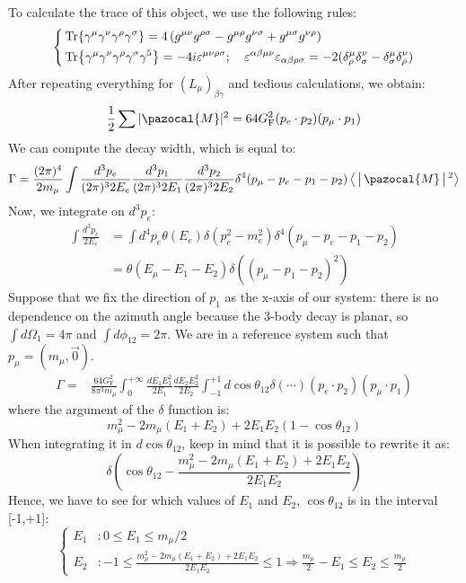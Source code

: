 \documentclass[../main.tex]{subfiles}
\begin{document}
To calculate the trace of this object, we use the following rules:
\[
\left\{
\begin{aligned}
&\Tr{\gamma^\mu\gamma^\nu\gamma^\rho\gamma^\sigma}=4\left(g^{\mu\nu}g^{\rho\sigma}-g^{\mu\rho}g^{\nu\sigma}+g^{\mu\sigma}g^{\nu\rho}\right)\\
&\Tr{\gamma^\mu\gamma^\nu\gamma^\rho\gamma^\sigma\gamma^5}=-4i\varepsilon^{\mu\nu\rho\sigma}; \quad \varepsilon^{\alpha\beta\mu\nu}\varepsilon_{\alpha\beta\rho\sigma}=-2(\delta^\mu_\rho\delta^\nu_\sigma-\delta^\mu_\sigma\delta^\nu_\rho)
\end{aligned}
\right.
\]
After repeating everything for $(L_\mu)_{\beta\gamma}$ and tedious calculations, we obtain:
\[
\frac{1}{2}\sum|\pazocal{M}|^2=64G^2_{\text{F}}(p_e\cdot p_2)(p_\mu\cdot p_1)
\]
We can compute the decay width, which is equal to:
\[
\Gamma=\frac{(2\pi)^4}{2m_\mu}\int\frac{d^3p_e}{(2\pi)^32E_e}\frac{d^3p_1}{(2\pi)^32E_1}\frac{d^3p_2}{(2\pi)^32E_2}\delta^4(p_\mu-p_e-p_1-p_2)\Braket{|\pazocal{M}|^2}
\]
Now, we integrate on $d^3p_e$:
\begin{align*}
\int\frac{d^3p_e}{2E_e}&=\int d^4p_e\theta(E_e)\delta(p_e^2-m_e^2)\delta^4(p_\mu-p_e-p_1-p_2)\\
&=\theta(E_\mu-E_1-E_2)\delta((p_\mu-p_1-p_2)^2)
\end{align*}
Suppose that we fix the direction of $p_1$ as the x-axis of our system: there is no dependence on the azimuth angle because the 3-body decay is planar, so $\int d\Omega_1=4\pi$ and $\int d\phi_{12}=2\pi$. We are in a reference system such that $p_\mu=(m_\mu,\Vec{0})$.
\begin{align*}
\Gamma=&\frac{64G_{\text{F}}^2}{8\pi^3m_\mu}\int_0^{+\infty}\frac{dE_1E_1^2}{2E_1}\frac{dE_2E_2^2}{2E_2}\int_{-1}^{+1}d\cos\theta_{12}\delta(\cdots)(p_e\cdot p_2)(p_\mu\cdot p_1)
\end{align*}
where the argument of the $\delta$ function is:
\[
m_\mu^2-2m_\mu(E_1+E_2)+2E_1E_2(1-\cos\theta_{12})
\]
When integrating it in $d\cos\theta_{12}$, keep in mind that it is possible to rewrite it as:
\[
\delta\left(\cos\theta_{12}-\frac{m_\mu^2-2m_\mu(E_1+E_2)+2E_1E_2}{2E_1E_2}\right)
\]
Hence, we have to see for which values of $E_1$ and $E_2$, $\cos\theta_{12}$ is in the interval [-1,+1]:
\[
\left\{
\begin{aligned}
E_1&: 0\le E_1\le m_\mu/2\\
E_2&: -1\le\frac{m_\mu^2-2m_\mu(E_1+E_2)+2E_1E_2}{2E_1E_2}\le1\Rightarrow\frac{m_\mu}{2}-E_1\le E_2\le\frac{m_\mu}{2}
\end{aligned}
\right.
\]
\end{document}
